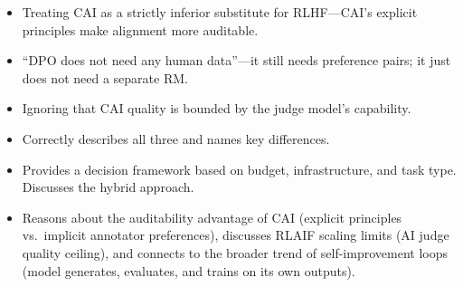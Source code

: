 \begin{interviewq}
\redflags
\begin{itemize}
    \item Treating CAI as a strictly inferior substitute for RLHF---CAI's explicit principles make alignment more auditable.
    \item ``DPO does not need any human data''---it still needs preference pairs; it just does not need a separate RM.
    \item Ignoring that CAI quality is bounded by the judge model's capability.
\end{itemize}


\goodgreat
\begin{itemize}
    \item {} Correctly describes all three and names key differences.
    \item {} Provides a decision framework based on budget, infrastructure, and task type. Discusses the hybrid approach.
    \item {} Reasons about the auditability advantage of CAI (explicit principles vs.\ implicit annotator preferences), discusses RLAIF scaling limits (AI judge quality ceiling), and connects to the broader trend of self-improvement loops (model generates, evaluates, and trains on its own outputs).
\end{itemize}

\end{interviewq}


